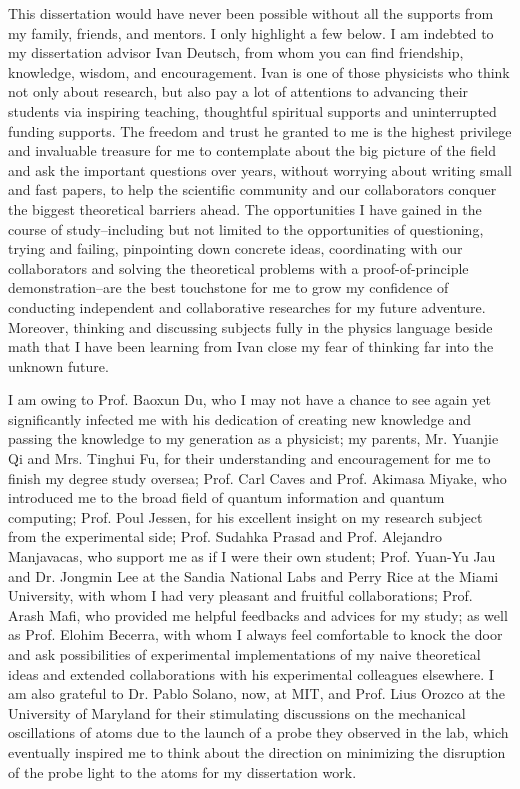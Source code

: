 \begin{acknowledgments}
\noindent This dissertation would have never been possible without all the supports from my family, friends, and mentors. I only highlight a few below. 
I am indebted to my dissertation advisor Ivan Deutsch, from whom you can find friendship, knowledge, wisdom, and encouragement.  Ivan is one of those physicists who think not only about research, but also pay a lot of attentions to advancing their students via inspiring teaching, thoughtful spiritual supports and uninterrupted funding supports. The freedom and trust he granted to me is the highest privilege and invaluable treasure for me to contemplate about the big picture of the field and ask the important questions over years, without worrying about writing small and fast papers, to help the scientific community and our collaborators conquer the biggest theoretical barriers ahead. The opportunities I have gained in the course of study--including but not limited to the opportunities of questioning, trying and failing, pinpointing down concrete ideas, coordinating with our collaborators and solving the theoretical problems with a proof-of-principle demonstration--are the best touchstone for me to grow my confidence of conducting independent and collaborative researches for my future adventure. Moreover, thinking and discussing subjects fully in the physics language beside math that I have been learning from Ivan close my fear of thinking far into the unknown future. 

I am owing to Prof. Baoxun Du, who I may not have a chance to see again yet significantly infected me with his dedication of creating new knowledge and passing the knowledge to my generation as a physicist; my parents, Mr. Yuanjie Qi and Mrs. Tinghui Fu, for their understanding and encouragement for me to finish my degree study oversea; Prof. Carl Caves and Prof. Akimasa Miyake, who introduced me to the broad field of quantum information and quantum computing; Prof. Poul Jessen, for his excellent insight on my research subject from the experimental side; Prof. Sudahka Prasad and Prof. Alejandro Manjavacas, who support me as if I were their own student; Prof. Yuan-Yu Jau and Dr. Jongmin Lee at the Sandia National Labs and Perry Rice at the Miami University, with whom I had very pleasant and fruitful collaborations; Prof. Arash Mafi, who provided me helpful feedbacks and advices for my study; as well as Prof. Elohim Becerra, with whom I always feel comfortable to knock the door and ask possibilities of experimental implementations of my naive theoretical ideas and extended collaborations with his experimental colleagues elsewhere. I am also grateful to Dr. Pablo Solano, now, at MIT, and Prof. Lius Orozco at the University of Maryland for their stimulating discussions on the mechanical oscillations of atoms due to the launch of a probe they observed in the lab, which eventually inspired me to think about the direction on minimizing the disruption of the probe light to the atoms for my dissertation work. 


\end{acknowledgments}
